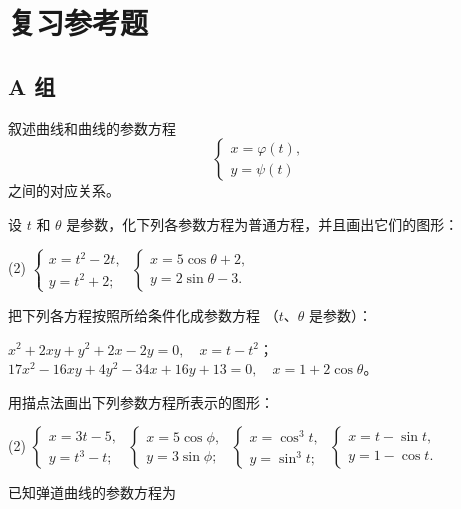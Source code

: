 \chapter*{复习参考题}
\section*{A 组}
\begin{question}
  \item 叙述曲线和曲线的参数方程
  \[ \begin{cases} x=\varphi(t),\\y=\psi(t)  \end{cases}\]
  之间的对应关系。
  \item 设 $t$ 和 $\theta$ 是参数，化下列各参数方程为普通方程，并且画出它们的图形：
  \begin{tasks}(2)
    \task $\begin{cases} x=t^2-2t,\\ y=t^2+2;\end{cases}$
    \task $\begin{cases} x=5\cos\theta+2,\\ y=2\sin\theta-3.\end{cases}$
  \end{tasks}
  \item 把下列各方程按照所给条件化成参数方程 （$t$、$\theta$ 是参数）：
  \begin{tasks}
    \task $x^2+2xy+y^2+2x-2y=0, \quad x=t-t^2$；
    \task $17x^2-16xy+4y^2-34x+16y+13=0, \quad x=1+2\cos\theta$。
  \end{tasks}
  \item 用描点法画出下列参数方程所表示的图形：
  \begin{tasks}(2)
    \task $\begin{cases} x=3t-5,\\ y=t^3-t; \end{cases}$
    \task $\begin{cases} x=5\cos\phi,\\ y=3\sin\phi; \end{cases}$
    \task $\begin{cases} x=\cos^3t,\\ y=\sin^3t; \end{cases}$
    \task $\begin{cases} x=t-\sin t,\\ y=1-\cos t. \end{cases}$
  \end{tasks}
  \item 已知弹道曲线的参数方程为

\end{question}
